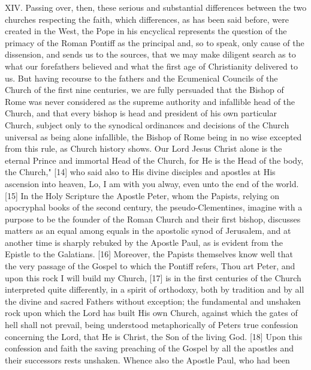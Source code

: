 XIV. Passing over, then, these serious and substantial differences
between the two churches respecting the faith, which differences, as has
been said before, were created in the West, the Pope in his encyclical
represents the question of the primacy of the Roman Pontiff as the
principal and, so to speak, only cause of the dissension, and sends us
to the sources, that we may make diligent search as to what our
forefathers believed and what the first age of Christianity delivered to
us. But having recourse to the fathers and the Ecumenical Councils of
the Church of the first nine centuries, we are fully persuaded that the
Bishop of Rome was never considered as the supreme authority and
infallible head of the Church, and that every bishop is head and
president of his own particular Church, subject only to the synodical
ordinances and decisions of the Church universal as being alone
infallible, the Bishop of Rome being in no wise excepted from this rule,
as Church history shows. Our Lord Jesus Christ alone is the eternal
Prince and immortal Head of the Church, for \textquotesingle He is the
Head of the body, the Church," {[}14{]} who said also to His divine
disciples and apostles at His ascension into heaven,
\textquotesingle Lo, I am with you alway, even unto the end of the
world.\textquotesingle{} {[}15{]} In the Holy Scripture the Apostle
Peter, whom the Papists, relying on apocryphal books of the second
century, the pseudo-Clementines, imagine with a purpose to be the
founder of the Roman Church and their first bishop, discusses matters as
an equal among equals in the apostolic synod of Jerusalem, and at
another time is sharply rebuked by the Apostle Paul, as is evident from
the Epistle to the Galatians. {[}16{]} Moreover, the Papists themselves
know well that the very passage of the Gospel to which the Pontiff
refers, \textquotesingle Thou art Peter, and upon this rock I will build
my Church,\textquotesingle{} {[}17{]} is in the first centuries of the
Church interpreted quite differently, in a spirit of orthodoxy, both by
tradition and by all the divine and sacred Fathers without exception;
the fundamental and unshaken rock upon which the Lord has built His own
Church, against which the gates of hell shall not prevail, being
understood metaphorically of Peter\textquotesingle s true confession
concerning the Lord, that \textquotesingle He is Christ, the Son of the
living God.\textquotesingle{} {[}18{]} Upon this confession and faith
the saving preaching of the Gospel by all the apostles and their
successors rests unshaken. Whence also the Apostle Paul, who had been
